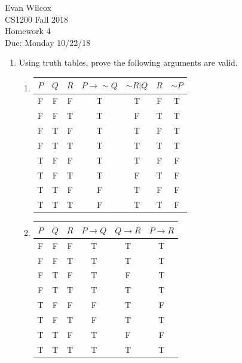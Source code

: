 \documentclass{article}
\begin{document}
    
\begin{flushleft}
    Evan Wilcox\\
    CS1200 Fall 2018\\
    Homework 4\\
    Due: Monday 10/22/18
\end{flushleft}
    
\begin{enumerate}

    \item Using truth tables, prove the following arguments are valid.
    \begin{enumerate}
        
        \item 
        \begin{tabular}{ |c|c|c|c|c|c|c| }
            \hline
            $P$ & $Q$ & $R$ & $P \rightarrow \sim Q$ & $\sim R|Q$ & $R$ & $\sim P$\\
            \hline
            F & F & F & T & T & F & T\\
            \hline
            F & F & T & T & F & T & T\\
            \hline
            F & T & F & T & T & F & T\\
            \hline
            F & T & T & T & T & T & T\\
            \hline
            T & F & F & T & T & F & F\\
            \hline
            T & F & T & T & F & T & F\\
            \hline
            T & T & F & F & T & F & F\\
            \hline
            T & T & T & F & T & T & F\\
            \hline
        \end{tabular}

        \item 
        \begin{tabular}{ |c|c|c|c|c|c| }
            \hline
            $P$ & $Q$ & $R$ & $P \rightarrow Q$ & $Q \rightarrow R$ & $P \rightarrow R$\\
            \hline
            F & F & F & T & T & T\\
            \hline
            F & F & T & T & T & T\\
            \hline
            F & T & F & T & F & T\\
            \hline
            F & T & T & T & T & T\\
            \hline
            T & F & F & F & T & F\\
            \hline
            T & F & T & F & T & T\\
            \hline
            T & T & F & T & F & F\\
            \hline
            T & T & T & T & T & T\\
            \hline
        \end{tabular}
        

\end{enumerate}
\end{enumerate}
\end{document}
